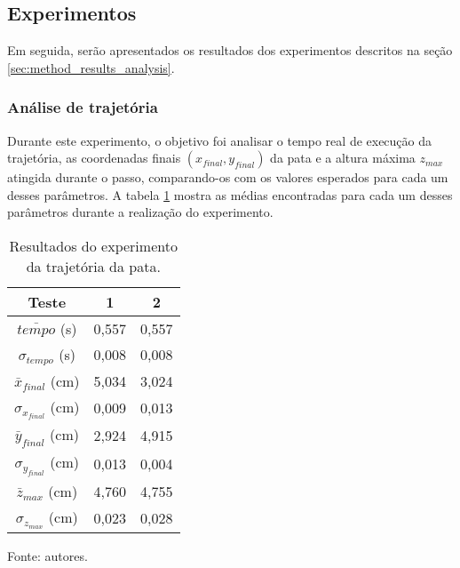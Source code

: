 \documentclass[../main.tex]{subfiles}
\begin{document}
  \subsection{Experimentos}
  Em seguida, serão apresentados os resultados dos experimentos descritos na seção \ref{sec:method_results_analysis}.

  \subsubsection{Análise de trajetória}
  Durante este experimento, o objetivo foi analisar o tempo real de execução da trajetória, as coordenadas finais $(x_{final}, y_{final})$ da pata e a altura máxima $z_{max}$ atingida durante o passo, comparando-os com os valores esperados para cada um desses parâmetros. A tabela \ref{tab:trajetoria} mostra as médias encontradas para cada um desses parâmetros durante a realização do experimento.

  \begin{table}[!htb]
    \caption{Resultados do experimento da trajetória da pata.}
    \centering
    \begin{tabular}{ccc}
      \hline
      Teste & 1         & 2        \\
      \hline
      $\bar{tempo}$ (s)          & 0,557  & 0,557 \\
      \hline
      $\sigma_{tempo}$ (s)       & 0,008  & 0,008 \\
      \hline
      $\bar{x}_{final}$ (cm)     & 5,034  & 3,024 \\
      \hline
      $\sigma_{x_{final}}$ (cm)  & 0,009  & 0,013 \\
      \hline
      $\bar{y}_{final}$ (cm)     & 2,924  & 4,915 \\      
      \hline
      $\sigma_{y_{final}}$ (cm)  & 0,013  & 0,004 \\      
      \hline
      $\bar{z}_{max}$ (cm)       & 4,760  & 4,755 \\      
      \hline
      $\sigma_{z_{max}}$ (cm)    & 0,023  & 0,028 \\
      \hline   
    \end{tabular}

    Fonte: autores.
    \label{tab:trajetoria}
  \end{table}
\end{document}
